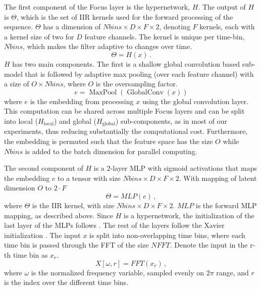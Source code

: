 \documentclass[11pt]{article}
\begin{document}
The first component of the Focus layer is the hypernetwork, $H$. The output of $H$ is $\Theta$, which is the set of IIR kernels used for the forward processing of the sequence. $\Theta$ has a dimension of $Nbins\times D\times F \times 2$, denoting $F$ kernels, each with a kernel size of two for $D$ feature channels. The kernel is unique per time-bin, $Nbins$, which makes the filter adaptive to changes over time. 
\begin{equation}
    \Theta = H(x)\,.
\end{equation}
$H$ has two main components. The first is a shallow global convolution \cite{fu2023simple} based sub-model that is followed by adaptive max pooling (over each feature channel) \cite{Pytorch} with a size of $O\times Nbins$, where $O$ is the oversampling factor.
\begin{equation}
    e = \operatorname{MaxPool}(\operatorname{GlobalConv}(x))
\end{equation}
where $e$ is the embedding from processing $x$ using the global convolution layer. 
This computation can be shared across multiple Focus layers and can be split into local ($H_{\text{local}}$) and global ($H_{\text{global}}$) sub-components, as in most of our experiments, thus reducing substantially the computational cost. Furthermore, the embedding is permuted such that the feature space has the size $O$ while $Nbins$ is added to the batch dimension for parallel computing.

The second component of $H$ is a 2-layer MLP with sigmoid activations that maps the embedding $e$ to a tensor with size $Nbins\times D\times F\times 2$.
With mapping of latent dimension $O$ to $2\cdot F$
\begin{equation}
    \Theta= MLP(e)\,,
\end{equation}
where $\Theta$ is the IIR kernel, with size $Nbins\times D\times F\times 2$. $MLP$ is the forward MLP mapping, as described above. Since $H$ is a hypernetwork, the initialization of the last layer of the MLPs follows \cite{Chang2020Principled}. The rest of the layers follow the Xavier initialization \cite{pmlr-v9-glorot10a}.
The input $x$ is split into non-overlapping time bins, where each time bin is passed through the FFT of the size $NFFT$. Denote the input in the r-th time bin as $x_r$.
\begin{equation}
    X[\omega, r] = FFT(x_r)\,,
\end{equation}
where $\omega$ is the normalized frequency variable, sampled evenly on $2\pi$ range, and $r$ is the index over the different time bins.
\end{document}
